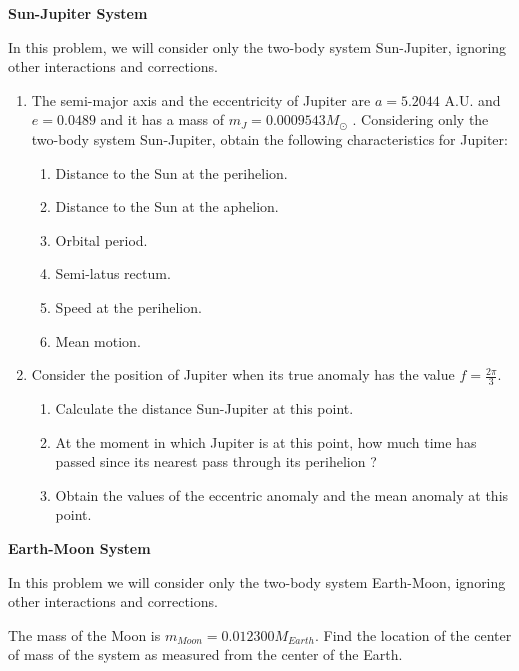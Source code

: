  
 \begin{exercise}
 \textbf{Sun-Jupiter System}
 
 In this problem, we will consider only the two-body system Sun-Jupiter, ignoring other interactions and corrections.
 
 \begin{enumerate}
 \item The semi-major axis and the eccentricity of Jupiter are $a=5.2044 \textrm{ A.U.}$ and $e=0.0489$ and it has a mass of $m_J = 0.0009543 M_{\odot }$ \cite{JupiterData}. Considering only the two-body system Sun-Jupiter, obtain the following characteristics for Jupiter:
 \begin{enumerate}
 \item Distance to the Sun at the perihelion.
 \item Distance to the Sun at the aphelion.
 \item Orbital period.
 \item Semi-latus rectum.
 \item Speed at the perihelion.
 \item Mean motion.
 \end{enumerate}
 
 \item Consider the position of Jupiter when its true anomaly has the value $f=\frac{2\pi}{3}$. 
 \begin{enumerate}
 \item Calculate the distance Sun-Jupiter at this point.
 \item At the moment in which Jupiter is at this point, how much time has passed since its nearest pass through its perihelion ?
 \item Obtain the values of the eccentric anomaly and the mean anomaly at this point.
 \end{enumerate}
 \end{enumerate}
 \end{exercise}

\begin{exercise}
 \textbf{Earth-Moon System}
 
 In this problem we will consider only the two-body system Earth-Moon, ignoring other interactions and corrections.
 \item The mass of the Moon is $m_{Moon} = 0.012300 M_{Earth}$. Find the location of the center of mass of the system as measured from the center of the Earth.
 \end{exercise}


